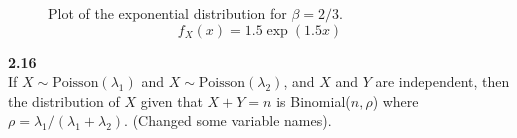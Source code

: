 \begin{figure}[H]
\begin{minipage}{0.5\textwidth}
        \bigskip\bigskip\bigskip\bigskip\bigskip\bigskip\bigskip
        \medskip\noindent
        \quad Plot of the exponential distribution for $\beta = 2/3$.
        $$
f_X(x) = 1.5\exp{(1.5x)}
        $$
    \end{minipage}
\end{figure}


\bigskip\noindent
\textbf{2.16}\\  %
If $X\sim\text{Poisson}(\lambda_1)$ and $X\sim\text{Poisson}(\lambda_2)$, and $X$ and $Y$
are independent, then the distribution of $X$ given that $X+Y = n$ is
Binomial($n, \rho$) where $\rho = \lambda_1/(\lambda_1 + \lambda_2)$. (Changed some variable names).

